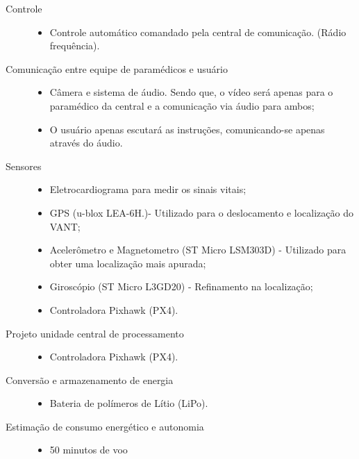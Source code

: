 \begin{description}
\begin{itemize}
  	\end{itemize}
  \item[Controle] \hfill 
  	\begin{itemize}
  		\item Controle automático comandado pela central de comunicação. (Rádio frequência).
  	\end{itemize}
  \item[Comunicação entre equipe de paramédicos e usuário] \hfill 
  	\begin{itemize}
  		\item Câmera e sistema de áudio. Sendo que, o vídeo será apenas para o paramédico da central e a comunicação via áudio para ambos;
  		\item O usuário apenas escutará as instruções, comunicando-se apenas através do áudio.
  	\end{itemize}
  \item[Sensores] \hfill 
  	\begin{itemize}
  		\item Eletrocardiograma para medir os sinais vitais;
		\item GPS (u-blox LEA-6H.)- Utilizado para o deslocamento e localização do VANT;
		\item Acelerômetro e Magnetometro (ST Micro LSM303D) - Utilizado para obter uma localização mais apurada;
		\item Giroscópio (ST Micro L3GD20) - Refinamento na localização;
		\item Controladora Pixhawk (PX4).
  	\end{itemize}
  \item[Projeto unidade central de processamento] \hfill 
  	\begin{itemize}
  		\item Controladora Pixhawk (PX4).
  	\end{itemize}
  \item[Conversão e armazenamento de energia] \hfill 
  	\begin{itemize}
  		\item Bateria de polímeros de Lítio (LiPo).
  	\end{itemize}
  \item[Estimação de consumo energético e autonomia] \hfill 
  	\begin{itemize}
  		\item 50 minutos de voo
  	\end{itemize}
\end{description}

